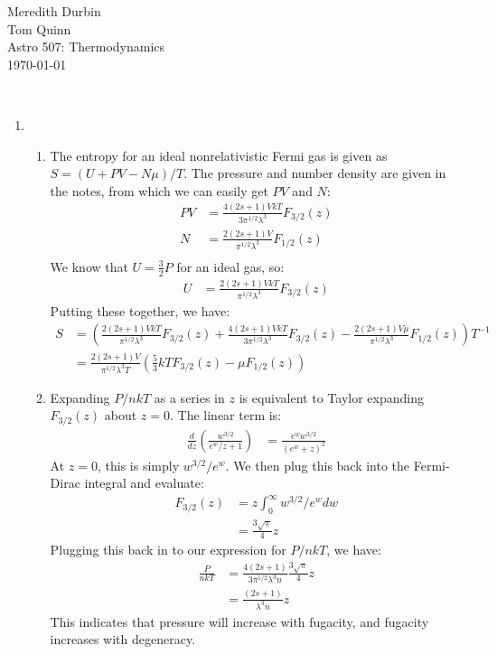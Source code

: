 \documentclass[11pt]{article}
\begin{document}
\begin{flushright}Meredith Durbin\\
Tom Quinn\\
Astro 507: Thermodynamics\\
\today\\

\end{flushright}

 \\[6pt]

\begin{enumerate}

\item
	\begin{enumerate}
    \item The entropy for an ideal nonrelativistic Fermi gas is given as $S = (U + PV -N\mu)/T$. The pressure and number density are given in the notes, from which we can easily get $PV$ and $N$:
    \begin{align}
    PV &= \frac{4(2s+1)VkT}{3\pi^{1/2}\lambda^3}F_{3/2}(z) \\
    N &= \frac{2(2s+1)V}{\pi^{1/2}\lambda^3}F_{1/2}(z) \\
    \end{align}
    We know that $U = \frac{3}{2}P$ for an ideal gas, so:
    \begin{align}
    U &= \frac{2(2s+1)VkT}{\pi^{1/2}\lambda^3}F_{3/2}(z)
    \end{align}
    Putting these together, we have:
    \begin{align}
    S &= \left(\frac{2(2s+1)VkT}{\pi^{1/2}\lambda^3}F_{3/2}(z) + \frac{4(2s+1)VkT}{3\pi^{1/2}\lambda^3}F_{3/2}(z) - \frac{2(2s+1)V\mu}{\pi^{1/2}\lambda^3}F_{1/2}(z) \right)T^{-1} \\
    &= \frac{2(2s+1)V}{\pi^{1/2}\lambda^3 T} \left( \frac{5}{3}kTF_{3/2}(z) - \mu F_{1/2}(z) \right)
    \end{align}
    \item Expanding $P/nkT$ as a series in $z$ is equivalent to Taylor expanding $F_{3/2}(z)$ about $z=0$. The linear term is:
    \begin{align}
    \frac{d}{dz}\left(\frac{w^{3/2}}{e^w/z+1}\right) &= \frac{e^w w^{3/2}}{(e^w+z)^2}
    \end{align}
    At $z=0$, this is simply $w^{3/2}/e^w$. We then plug this back into the Fermi-Dirac integral and evaluate:
    \begin{align}
    F_{3/2}(z) &= z\int_0^\infty w^{3/2}/e^w dw \\
    &= \frac{3\sqrt{\pi}}{4}z
    \end{align}
    Plugging this back in to our expression for $P/nkT$, we have:
    \begin{align}
    \frac{P}{nkT} &= \frac{4(2s+1)}{3\pi^{1/2}\lambda^3n}\frac{3\sqrt{\pi}}{4}z \\
    &= \frac{(2s+1)}{\lambda^3n}z
    \end{align}
    This indicates that pressure will increase with fugacity, and fugacity increases with degeneracy.
    \end{enumerate}
    

\end{enumerate}
\end{document}
